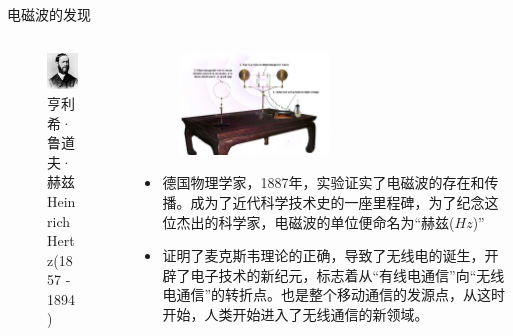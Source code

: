 \begin{frame}{电磁波的发现}
  \begin{columns}
    \begin{column}{0.35\linewidth}
      \begin{figure}
        \includegraphics[width=3.5cm]{Cha1//hertz.jpg}
        \caption{亨利希·鲁道夫·赫兹 Heinrich Hertz(1857 - 1894)}
      \end{figure}
    \end{column}
    \begin{column}{0.65\linewidth}
      \begin{figure}
        \flushright
        \includegraphics[width=4cm]{Cha1//HERTZ_TABLE.jpg}
      \end{figure}
      \begin{itemize}
        \item 德国物理学家，1887年，实验证实了电磁波的存在和传播。成为了近代科学技术史的一座里程碑，为了纪念这位杰出的科学家，电磁波的单位便命名为“赫兹($Hz$)”
        \item 证明了麦克斯韦理论的正确，导致了无线电的诞生，开辟了电子技术的新纪元，标志着从“有线电通信”向“无线电通信”的转折点。也是整个移动通信的发源点，从这时开始，人类开始进入了无线通信的新领域。
      \end{itemize}
    \end{column}
  \end{columns}
\end{frame}

